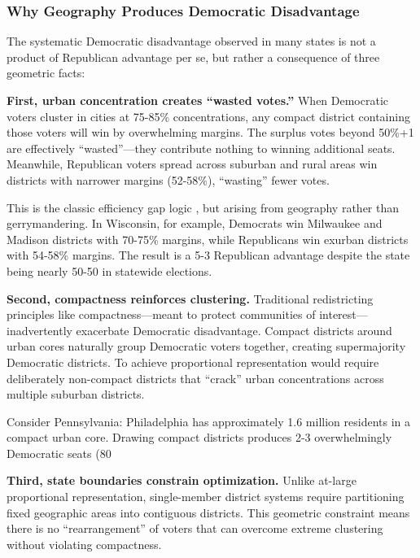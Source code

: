 \subsubsection{Why Geography Produces Democratic Disadvantage}

The systematic Democratic disadvantage observed in many states is not a product of Republican advantage per se, but rather a consequence of three geometric facts:

\textbf{First, urban concentration creates ``wasted votes.''} When Democratic voters cluster in cities at 75-85\% concentrations, any compact district containing those voters will win by overwhelming margins. The surplus votes beyond 50\%+1 are effectively ``wasted''---they contribute nothing to winning additional seats. Meanwhile, Republican voters spread across suburban and rural areas win districts with narrower margins (52-58\%), ``wasting'' fewer votes.

This is the classic efficiency gap logic \citep{stephanopoulos2015}, but arising from geography rather than gerrymandering. In Wisconsin, for example, Democrats win Milwaukee and Madison districts with 70-75\% margins, while Republicans win exurban districts with 54-58\% margins. The result is a 5-3 Republican advantage despite the state being nearly 50-50 in statewide elections.

\textbf{Second, compactness reinforces clustering.} Traditional redistricting principles like compactness---meant to protect communities of interest---inadvertently exacerbate Democratic disadvantage. Compact districts around urban cores naturally group Democratic voters together, creating supermajority Democratic districts. To achieve proportional representation would require deliberately non-compact districts that ``crack'' urban concentrations across multiple suburban districts.

Consider Pennsylvania: Philadelphia has approximately 1.6 million residents in a compact urban core. Drawing compact districts produces 2-3 overwhelmingly Democratic seats (80%

\textbf{Third, state boundaries constrain optimization.} Unlike at-large proportional representation, single-member district systems require partitioning fixed geographic areas into contiguous districts. This geometric constraint means there is no ``rearrangement'' of voters that can overcome extreme clustering without violating compactness.

